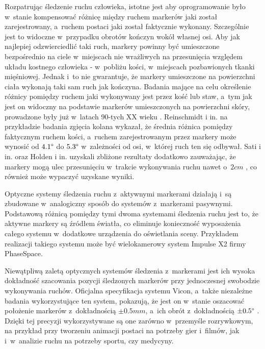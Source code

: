 Rozpatrując śledzenie ruchu człowieka, istotne jest aby oprogramowanie było w~stanie kompensować różnicę między ruchem markerów jaki został zarejestrowany, a~ruchem postaci jaki został faktycznie wykonany. Szczególnie jest to widoczne w~przypadku obrotów kończyn wokół własnej osi. Aby jak najlepiej odzwierciedlić taki ruch, markery powinny być umieszczone bezpośrednio na ciele w~miejscach nie wrażliwych na przesunięcia względem układu kostnego człowieka - w~pobliżu kości, w~miejscach pozbawionych tkanki mięśniowej. Jednak i~to nie gwarantuje, że markery umieszczone na powierzchni ciała wykonają taki sam ruch jak kończyna. Badania mające na celu określenie różnicy pomiędzy ruchem jaki wykonywany jest przez kość lub staw, a~tym jak jest on widoczny na podstawie markerów umieszczonych na powierzchni skóry, prowadzone były już w~latach 90-tych XX wieku \cite{Sati2016,Reinschmidt2016,Holden2016}. Reinschmidt i in. \cite{Reinschmidt2016} na przykładzie badania zgięcia kolana wykazał, że średnia różnica pomiędzy faktycznym ruchem kości, a~ruchem zarejestrowanym przez markery może wynosić od $4.1\degree$ do $5.3\degree$ w~zależności od osi, w~której ruch ten się odbywał. Sati i in. \cite{Sati2016} oraz Holden i in. \cite{Holden2016} uzyskali zbliżone rezultaty dodatkowo zauważając, że markery mogą ulec przesunięciu w~trakcie wykonywania ruchu nawet o~$2cm$ \cite{Sati2016}, co również może wypaczyć uzyskane wyniki. 
			
Optyczne systemy śledzenia ruchu z~aktywnymi markerami działają i~są zbudowane w~analogiczny sposób do systemów z~markerami pasywnymi. Podstawową różnicą pomiędzy tymi dwoma systemami śledzenia ruchu jest to, że aktywne markery są źródłem światła, co eliminuje konieczność wyposażenia całego systemu w~dodatkowe urządzenia do oświetlania sceny. Przykładem realizacji takiego systemu może być wielokamerowy system Impulse X2 firmy PhaseSpace{}.
			
Niewątpliwą zaletą optycznych systemów śledzenia z~markerami jest ich wysoka dokładność szacowania pozycji śledzonych markerów przy jednoczesnej swobodzie wykonywania ruchów. Oficjalna specyfikacja systemu Vicon, a~także niezależne badania wykorzystujące ten system, pokazują, że jest on w~stanie oszacować położenie markerów z~dokładnością $\pm0.5mm$, a~ich obrót z~dokładnością $\pm0.5 \degree$ \cite{Windolf2008}. Dzięki tej precyzji wykorzystywane są one zarówno w~przemyśle rozrywkowym, na przykład przy tworzeniu animacji postaci na potrzeby gier i~filmów, jak i~w~analizie ruchu na potrzeby sportu, czy medycyny{}. 
			
